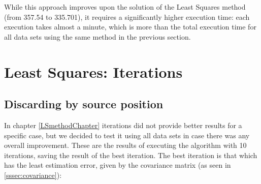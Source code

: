 While this approach improves upon the solution of the Least Squares method (from 357.54 to 335.701), it requires a significantly higher execution time: each execution takes almost a minute, which is more than the total execution time for all data sets using the same method in the previous section.

\clearpage

\section{Least Squares: Iterations}

\subsection{Discarding by source position}

In chapter \ref{LSmethodChapter} iterations did not provide better results for a specific case, but we decided to test it using all data sets in case there was any overall improvement. These are the results of executing the algorithm with 10 iterations, saving the result of the best iteration. The best iteration is that which has the least estimation error, given by the covariance matrix (as seen in \ref{sssec:covariance}):

